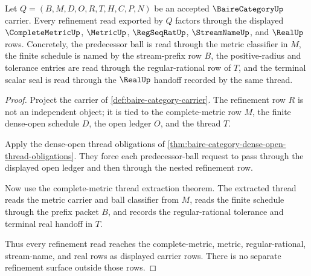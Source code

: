 \begin{theorem}
\label{thm:baire-category-complete-metric-refinement-scope}
Let $Q=(B,M,D,O,R,T,H,C,P,N)$ be an accepted $\BaireCategoryUp$ carrier. Every refinement read exported by $Q$ factors through the displayed $\CompleteMetricUp$, $\MetricUp$, $\RegSeqRatUp$, $\StreamNameUp$, and $\RealUp$ rows. Concretely, the predecessor ball is read through the metric classifier in $M$, the finite schedule is named by the stream-prefix row $B$, the positive-radius and tolerance entries are read through the regular-rational row of $T$, and the terminal scalar seal is read through the $\RealUp$ handoff recorded by the same thread.
\end{theorem}
\begin{proof}
Project the carrier of \autoref{def:baire-category-carrier}. The refinement row $R$ is not an independent object; it is tied to the complete-metric row $M$, the finite dense-open schedule $D$, the open ledger $O$, and the thread $T$.

Apply the dense-open thread obligations of \autoref{thm:baire-category-dense-open-thread-obligations}. They force each predecessor-ball request to pass through the displayed open ledger and then through the nested refinement row.

Now use the complete-metric thread extraction theorem. The extracted thread reads the metric carrier and ball classifier from $M$, reads the finite schedule through the prefix packet $B$, and records the regular-rational tolerance and terminal real handoff in $T$.

Thus every refinement read reaches the complete-metric, metric, regular-rational, stream-name, and real rows as displayed carrier rows. There is no separate refinement surface outside those rows.
\end{proof}

